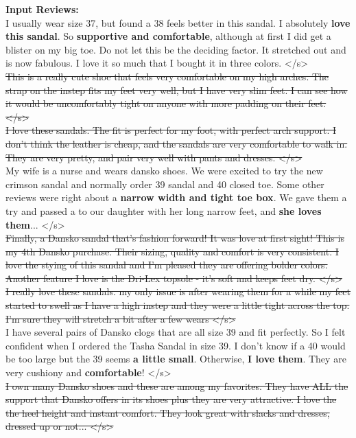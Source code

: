\documentclass[11pt]{article}
\newcommand{\gray}[1]{{\color[HTML]{808080} \sout{#1}}}
\newcommand\two[1]{\textcolor{c2}{\textbf{#1}}}
\newcommand\three[1]{\textcolor{c3}{\textbf{#1}}}
\newcommand\four[1]{\textcolor{c4}{\textbf{#1}}}
\begin{document}
\begin{figure*}[th]
    \small
    \vspace{1em}
    \begin{mdframed}
        \textbf{Input Reviews: }\\
        I usually wear size 37, but found a 38 feels better in this sandal. I absolutely \four{love this sandal}. So \two{supportive and comfortable}, although at first I did get a blister on my big toe. Do not let this be the deciding factor. It stretched out and is now fabulous. I love it so much that I bought it in three colors. </s> \\
        \gray{This is a really cute shoe that feels very comfortable on my high arches. The strap on the instep fits my feet very well, but I have very slim feet. I can see how it would be uncomfortably tight on anyone with more padding on their feet. </s>}\\
        \gray{I love these sandals. The fit is perfect for my foot, with perfect arch support. I don't think the leather is cheap, and the sandals are very comfortable to walk in. They are very pretty, and pair very well with pants and dresses. </s>}\\
        My wife is a nurse and wears dansko shoes. We were excited to try the new crimson sandal and normally order 39 sandal and 40 closed toe. Some other reviews were right about a  \three{narrow width and tight toe box}. We gave them a try and passed a  to our daughter with her long narrow feet, and \four{she loves them}... </s>\\
        \gray{Finally, a Dansko sandal that's fashion forward! It was love at first sight! This is my 4th Dansko purchase. Their sizing, quality and comfort is very consistent. I love the stying of this sandal and I'm pleased they are offering bolder colors. Another feature I love is the Dri-Lex topsole - it's soft and keeps feet dry. </s>} \\
        \gray{I really love these sandals. my only issue is after wearing them for a while my feet started to swell as I have a high instep and they were a little tight across the top. I'm sure they will stretch a bit after a few wears </s>}\\
        I have several pairs of Dansko clogs that are all size 39 and fit perfectly. So I felt confident when I ordered the Tasha Sandal in size 39. I don't know if a 40 would be too large but the 39 seems \three{a little small}. Otherwise, \four{I love them}. They are very cushiony and \two{comfortable}! </s>\\
        \gray{I own many Dansko shoes and these are among my favorites. They have ALL the support that Dansko offers in its shoes plus they are very attractive. I love the the heel height and instant comfort. They look great with slacks and dresses, dressed up or not... </s>}\\
        

\end{mdframed}
\end{figure*}
\end{document}
